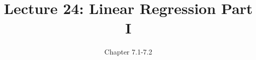 \documentclass[handout]{beamer}
\title{Lecture 24: Linear Regression Part I}
\author{Chapter 7.1-7.2}
\date{}
\newcommand{\blue}[1]{\textcolor{blue2}{#1}}
\begin{document}
\begin{frame}
\titlepage
\end{frame}


%
%
%
%
%
%
%
%
%
%
%
%
%
\end{document}
